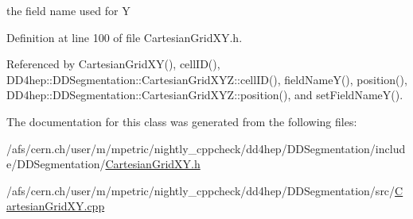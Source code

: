 the field name used for Y 



Definition at line 100 of file Cartesian\+Grid\+X\+Y.\+h.



Referenced by Cartesian\+Grid\+X\+Y(), cell\+I\+D(), D\+D4hep\+::\+D\+D\+Segmentation\+::\+Cartesian\+Grid\+X\+Y\+Z\+::cell\+I\+D(), field\+Name\+Y(), position(), D\+D4hep\+::\+D\+D\+Segmentation\+::\+Cartesian\+Grid\+X\+Y\+Z\+::position(), and set\+Field\+Name\+Y().



The documentation for this class was generated from the following files\+:\begin{DoxyCompactItemize}
\item 
/afs/cern.\+ch/user/m/mpetric/nightly\+\_\+cppcheck/dd4hep/\+D\+D\+Segmentation/include/\+D\+D\+Segmentation/\hyperlink{_d_d_segmentation_2include_2_d_d_segmentation_2_cartesian_grid_x_y_8h}{Cartesian\+Grid\+X\+Y.\+h}\item 
/afs/cern.\+ch/user/m/mpetric/nightly\+\_\+cppcheck/dd4hep/\+D\+D\+Segmentation/src/\hyperlink{_d_d_segmentation_2src_2_cartesian_grid_x_y_8cpp}{Cartesian\+Grid\+X\+Y.\+cpp}\end{DoxyCompactItemize}
